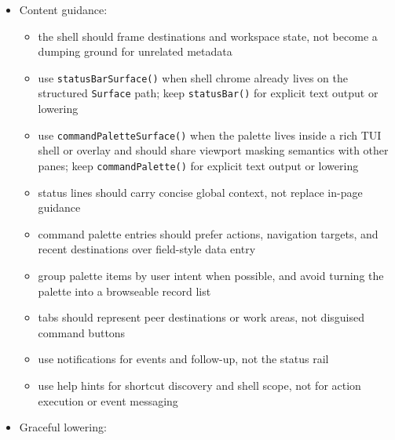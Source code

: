 \begin{itemize}
  \begin{itemize}
  \tightlist
  \item
    TUI
  \end{itemize}
\item
  Content guidance:

  \begin{itemize}
  \tightlist
  \item
    the shell should frame destinations and workspace state, not become a dumping ground for unrelated metadata
  \item
    use \texttt{s\allowbreak{}t\allowbreak{}a\allowbreak{}t\allowbreak{}u\allowbreak{}s\allowbreak{}B\allowbreak{}a\allowbreak{}r\allowbreak{}S\allowbreak{}u\allowbreak{}r\allowbreak{}f\allowbreak{}a\allowbreak{}c\allowbreak{}e\allowbreak{}(\allowbreak{})} when shell chrome already lives on the structured \texttt{S\allowbreak{}u\allowbreak{}r\allowbreak{}f\allowbreak{}a\allowbreak{}c\allowbreak{}e} path; keep \texttt{s\allowbreak{}t\allowbreak{}a\allowbreak{}t\allowbreak{}u\allowbreak{}s\allowbreak{}B\allowbreak{}a\allowbreak{}r\allowbreak{}(\allowbreak{})} for explicit text output or lowering
  \item
    use \texttt{c\allowbreak{}o\allowbreak{}m\allowbreak{}m\allowbreak{}a\allowbreak{}n\allowbreak{}d\allowbreak{}P\allowbreak{}a\allowbreak{}l\allowbreak{}e\allowbreak{}t\allowbreak{}t\allowbreak{}e\allowbreak{}S\allowbreak{}u\allowbreak{}r\allowbreak{}f\allowbreak{}a\allowbreak{}c\allowbreak{}e\allowbreak{}(\allowbreak{})} when the palette lives inside a rich TUI shell or overlay and should share viewport masking semantics with other panes; keep \texttt{c\allowbreak{}o\allowbreak{}m\allowbreak{}m\allowbreak{}a\allowbreak{}n\allowbreak{}d\allowbreak{}P\allowbreak{}a\allowbreak{}l\allowbreak{}e\allowbreak{}t\allowbreak{}t\allowbreak{}e\allowbreak{}(\allowbreak{})} for explicit text output or lowering
  \item
    status lines should carry concise global context, not replace in-page guidance
  \item
    command palette entries should prefer actions, navigation targets, and recent destinations over field-style data entry
  \item
    group palette items by user intent when possible, and avoid turning the palette into a browseable record list
  \item
    tabs should represent peer destinations or work areas, not disguised command buttons
  \item
    use notifications for events and follow-up, not the status rail
  \item
    use help hints for shortcut discovery and shell scope, not for action execution or event messaging
  \end{itemize}
\item
  Graceful lowering:


\end{itemize}
